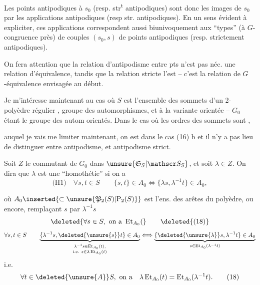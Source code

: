 Les points antipodiques à $s_0$ (resp. str\textsuperscript{t} antipodiques) sont donc les images de $s_0$ par les applications antipodiques (resp str. antipodiques). En un sens évident à expliciter, ces applications correspondent aussi biunivoquement aux ``types'' (à $G$-congruence près) de couples $(s_0,s)$ de points antipodiques (resp. strictement antipodiques).

On fera attention que la relation d'antipodisme entre pts n'est pas néc. une relation d'équivalence, tandis que la relation stricte l'est -- c'est la relation de $G$-équivalence envisagée au début.

Je m'intéresse maintenant au cas où $S$ est l'ensemble des sommets d'un 2-polyèdre  régulier ,   groupe des automorphismes,  et à la variante orientée -- $G_0$ étant  le groupe des autom orientés. Dans le cas où les ordres des sommets sont ,

auquel je vais me limiter maintenant, on est dans le cas (16) b et il n'y a pas lieu de distinguer entre antipodisme, et antipodisme strict.

Soit $Z$ le commutant de $G_0$ dans $\unsure{\mathfrak S_S|\mathscr S_S}$,  et soit $\lambda\in Z$. On dira que $\lambda$ est une ``homothétie'' si on a
\[
\text{(H1)}\quad\forall s,t\in S\qquad\{s,t\}\in A_0\Longleftrightarrow
\{\lambda s,\lambda^{-1}t\}\in A_0,\tag*{(17)}
\]

où $A_0\inserted{\subset\unsure{\mathfrak P_2(S)|\mathrm P_2(S)}}$ est l'ens. des arêtes du polyèdre,  ou encore, remplaçant  $s$ par $\lambda^{-1}s$
\[
\deleted{\forall s\in S,\ \text{on a }\operatorname{Et}_{A_0}(}\tag*{\deleted{(18)}}
\]
\[
\begin{aligned}
\forall s,t\in S\qquad
\underbrace{\{\lambda^{-1}s,\deleted{\unsure{s}}t\}\in A_0}_{\substack{\lambda^{-1}s\in\operatorname{Et}_{A_0}(t),\\\text{i.e. }s\in\lambda\operatorname{Et}_{A_0}(t)}}
\Longleftrightarrow
\underbrace{\{\deleted{\unsure{\lambda}}s,\lambda^{-1}t\}\in A_0}_{s\in\operatorname{Et}_{A_0}(\lambda^{-1}t)}
\end{aligned}
\]
i.e.
\[
\forall t\in\deleted{\unsure{A}}S,\ \text{on a}\quad
\lambda\operatorname{Et}_{A_0}(t)=\operatorname{Et}_{A_0}(\lambda^{-1}t).\tag*{(18)}
\]

